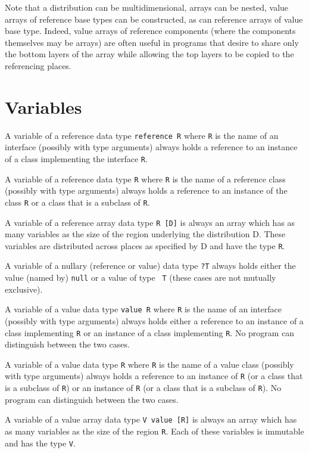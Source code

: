 Note that a distribution can be multidimensional, arrays can be
nested, value arrays of reference base types can be constructed, as
can reference arrays of value base type.  Indeed, value arrays of
reference components (where the components themselves may be arrays)
are often useful in programs that desire to share only the bottom
layers of the array while allowing the top layers to be copied to the
referencing places.





\section{Variables}\label{XtenVariables}

A variable of a reference data type {\tt reference R} where {\tt R} is
the name of an interface (possibly with type arguments) always holds a
reference to an instance of a class implementing the interface {\tt R}.

A variable of a reference data type {\tt R} where {\tt R} is the name
of a reference class (possibly with type arguments) always holds a
reference to an instance of the class {\tt R} or a class that is a
subclass of {\tt R}. 

A variable of a reference array data type {\tt R [D]} is always an
array which has as many variables as the size of the region underlying
the distribution {\cf D}. These variables are distributed across
places as specified by {\cf D} and have the type {\tt R}.

A variable of a nullary (reference or value) data type {\tt ?T} always
holds either the value (named by) {\tt null} or a value of type {\tt
T} (these cases are not mutually exclusive).

A variable of a value data type {\tt value R} where {\tt R} is the
name of an interface (possibly with type arguments) always holds
either a reference to an instance of a class implementing {\tt R} or
an instance of a class implementing {\tt R}. No program can
distinguish between the two cases.

A variable of a value data type {\tt R} where {\tt R} is the name of a
value class (possibly with type arguments) always holds a reference to
an instance of {\tt R} (or a class that is a subclass of {\tt R}) or
an instance of {\tt R} (or a class that is a subclass of {\tt R}). No
program can distinguish between the two cases.

A variable of a value array data type {\tt V value [R]} is always an
array which has as many variables as the size of the region {\tt R}.
Each of these variables is immutable and has the type {\tt V}.

